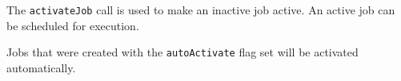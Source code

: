 The \verb+activateJob+ call is used to make an inactive job active. An active job can be scheduled for execution.

Jobs that were created with the \verb+autoActivate+ flag set will be activated automatically.

